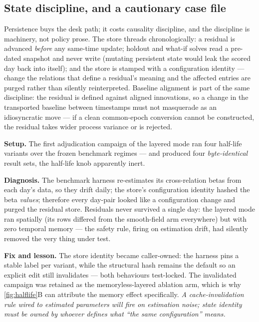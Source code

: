 \documentclass[11pt]{article}
\begin{document}
\subsection{State discipline, and a cautionary case file}
\label{sec:statediscipline}

Persistence buys the desk path; it costs causality discipline, and the
discipline is machinery, not policy prose.  The store threads
chronologically: a residual is advanced \emph{before} any same-time
update; holdout and what-if solves read a pre-dated snapshot and never
write (mutating persistent state would leak the scored day back into
itself); and the store is stamped with a configuration identity ---
change the relations that define a residual's meaning and the affected
entries are purged rather than silently reinterpreted.  Baseline
alignment is part of the same discipline: the residual is defined against
aligned innovations, so a change in the transported baseline between
timestamps must not masquerade as an idiosyncratic move --- if a clean
common-epoch conversion cannot be constructed, the residual takes wider
process variance or is rejected.

\begin{example}[title={Case file: the store that purged itself}]
\textbf{Setup.}  The first adjudication campaign of the layered mode ran
four half-life variants over the frozen benchmark regimes --- and
produced four \emph{byte-identical} result sets, the half-life knob
apparently inert.

\textbf{Diagnosis.}  The benchmark harness re-estimates its cross-relation
betas from each day's data, so they drift daily; the store's
configuration identity hashed the beta \emph{values}; therefore every
day-pair looked like a configuration change and purged the residual
store.  Residuals never survived a single day: the layered mode ran
spatially (its rows differed from the smooth-field arm everywhere) but
with zero temporal memory --- the safety rule, firing on estimation
drift, had silently removed the very thing under test.

\textbf{Fix and lesson.}  The store identity became caller-owned: the
harness pins a stable label per variant, while the structural hash
remains the default so an explicit edit still invalidates --- both
behaviours test-locked.  The invalidated campaign was retained as the
memoryless-layered ablation arm, which is why \cref{fig:halflife}B can
attribute the memory effect specifically.  \emph{A cache-invalidation
rule wired to estimated parameters will fire on estimation noise; state
identity must be owned by whoever defines what ``the same
configuration'' means.}
\end{example}
\end{document}
